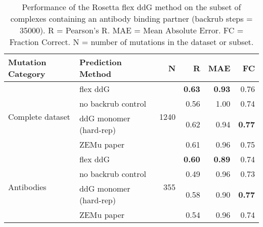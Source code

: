 \begin{table}
  \begin{tabular}{llrrrr}
\toprule
Mutation Category &       Prediction Method &     N &    R &  MAE &   FC \\
\midrule
 \multirow{ 4}{*}{Complete dataset} & flex ddG & \multirow{ 4}{*}{1240} & \textbf{0.63} & \textbf{0.93} & 0.76  \\
 & no backrub control & & 0.56 & 1.00 & 0.74  \\
 & ddG monomer (hard-rep) & & 0.62 & 0.94 & \textbf{0.77}  \\
 & ZEMu paper & & 0.61 & 0.96 & 0.75  \\
\hline
 \multirow{ 4}{*}{Antibodies} & flex ddG & \multirow{ 4}{*}{355} & \textbf{0.60} & \textbf{0.89} & 0.74  \\
 & no backrub control & & 0.49 & 0.96 & 0.73  \\
 & ddG monomer (hard-rep) & & 0.58 & 0.90 & \textbf{0.77}  \\
 & ZEMu paper & & 0.54 & 0.96 & 0.74  \\
\bottomrule
\end{tabular}
  \caption[Flex ddG performance on antibodies]{
    Performance of the Rosetta flex ddG method on the subset of complexes containing an antibody binding partner (backrub steps = 35000). R = Pearson's R. MAE = Mean Absolute Error. FC = Fraction Correct. N = number of mutations in the dataset or subset.
  } \label{tab:table-antibodies}
\end{table}
